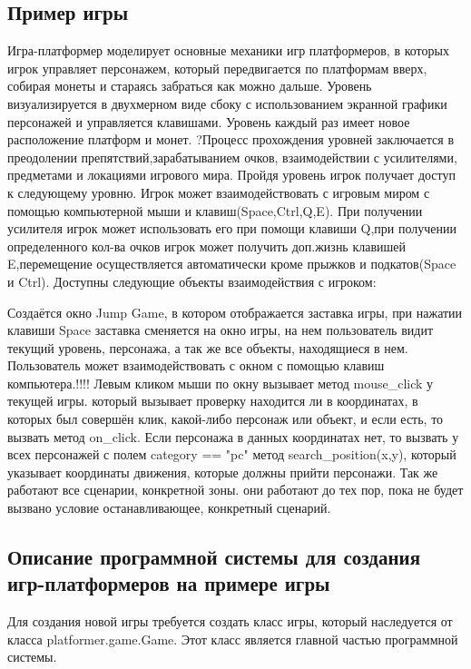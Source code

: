 \subsection{Пример игры}

Игра-платформер моделирует основные механики игр платформеров, в которых игрок управляет персонажем, который передвигается по платформам вверх, собирая монеты и стараясь забраться как можно дальше. Уровень визуализируется в двухмерном виде сбоку с использованием экранной графики персонажей и управляется клавишами. Уровень каждый раз имеет новое расположение платформ и монет.
?Процесс прохождения уровней заключается в преодолении препятствий,зарабатыванием очков, взаимодействии с усилителями, предметами и локациями игрового мира. Пройдя уровень игрок получает доступ к следующему уровню. Игрок может взаимодействовать с игровым миром с помощью компьютерной мыши и клавиш(Space,Ctrl,Q,E). При получении усилителя игрок может использовать его при помощи клавиши Q,при получении определенного кол-ва очков игрок может получить доп.жизнь клавишей E,перемещение осуществляется автоматически кроме прыжков и подкатов(Space и Ctrl). Доступны следующие объекты взаимодействия с игроком:


Создаётся окно Jump Game, в котором отображается  заставка игры, при нажатии клавиши Space заставка сменяется на окно игры, на нем пользователь видит текущий уровень, персонажа, а так же все объекты, находящиеся в нем. Пользователь может взаимодействовать с окном с помощью клавиш компьютера.!!!! Левым кликом мыши по окну вызывает метод mouse\_click у текущей игры. который вызывает проверку находится ли в координатах, в которых был совершён клик, какой-либо персонаж или объект, и если есть, то вызвать метод on\_click. Если персонажа в данных координатах нет, то вызвать у всех персонажей с полем category == "pc" метод search\_position(x,y), который указывает координаты движения, которые должны прийти персонажи. Так же работают все сценарии, конкретной зоны. они работают до тех пор, пока не будет вызвано условие останавливающее, конкретный сценарий.

\subsection{Описание программной системы для создания игр-платформеров на примере игры}

Для создания новой игры требуется создать класс игры, который наследуется от класса platformer.game.Game. Этот класс является главной частью программной системы.

